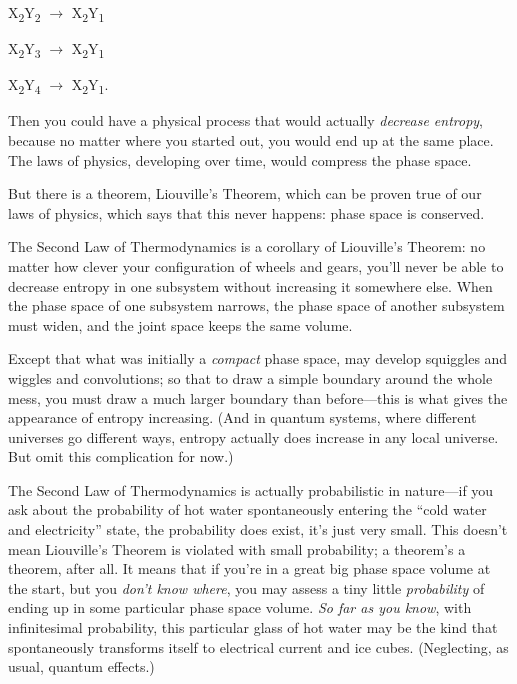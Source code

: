 \bigskip

{\centering
 X\textsubscript{2}Y\textsubscript{2} $\rightarrow $
X\textsubscript{2}Y\textsubscript{1}
\par}


\bigskip

{\centering
 X\textsubscript{2}Y\textsubscript{3} $\rightarrow $
X\textsubscript{2}Y\textsubscript{1}
\par}


\bigskip

{\centering
 X\textsubscript{2}Y\textsubscript{4} $\rightarrow $
X\textsubscript{2}Y\textsubscript{1}.
\par}


\bigskip

{
 Then you could have a physical process that would actually
\textit{decrease entropy}, because no matter where you started out, you
would end up at the same place. The laws of physics, developing over
time, would compress the phase space.}

{
 But there is a theorem, Liouville's Theorem, which
can be proven true of our laws of physics, which says that this never
happens: phase space is conserved.}

{
 The Second Law of Thermodynamics is a corollary of
Liouville's Theorem: no matter how clever your
configuration of wheels and gears, you'll never be able
to decrease entropy in one subsystem without increasing it somewhere
else. When the phase space of one subsystem narrows, the phase space of
another subsystem must widen, and the joint space keeps the same
volume.}

{
 Except that what was initially a \textit{compact} phase space, may
develop squiggles and wiggles and convolutions; so that to draw a
simple boundary around the whole mess, you must draw a much larger
boundary than before---this is what gives the appearance of entropy
increasing. (And in quantum systems, where different universes go
different ways, entropy actually does increase in any local universe.
But omit this complication for now.)}

{
 The Second Law of Thermodynamics is actually probabilistic in
nature---if you ask about the probability of hot water spontaneously
entering the ``cold water and
electricity'' state, the probability does exist,
it's just very small. This doesn't mean
Liouville's Theorem is violated with small probability;
a theorem's a theorem, after all. It means that if
you're in a great big phase space volume at the start,
but you \textit{don't know where}, you may assess a
tiny little \textit{probability} of ending up in some particular phase
space volume. \textit{So far as you know}, with infinitesimal
probability, this particular glass of hot water may be the kind that
spontaneously transforms itself to electrical current and ice cubes.
(Neglecting, as usual, quantum effects.)}

